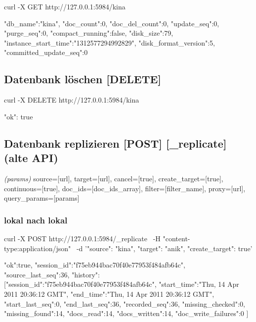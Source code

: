 \documentclass[19pt,landscape,twocolumn]{article}
\newcommand{\htmlverb}[1]{{[}\textbf{{#1}}{]}}
\newcommand{\brackets}[1]{{[}{#1}{]}}
\newcommand{\setparskip}{\setlength{\parskip}{-6mm}}
\newcommand{\resetparskip}{\setlength{\parskip}{1mm}}
\begin{document}
\begin{code}
curl -X GET http://127.0.0.1:5984/kina
\end{code}
\setparskip
\begin{response}
{"db_name":"kina",
 "doc_count":0,
 "doc_del_count":0,
 "update_seq":0,
 "purge_seq":0,
 "compact_running":false,
 "disk_size":79,
 "instance_start_time":"1312577294992829",
 "disk_format_version":5,
 "committed_update_seq":0}
\end{response}
\resetparskip

\subsection{Datenbank löschen \htmlverb{DELETE}}

\begin{code}
curl -X DELETE http://127.0.0.1:5984/kina
\end{code}
\setparskip
\begin{response}
{"ok": true}
\end{response}
\resetparskip

\subsection{Datenbank replizieren \htmlverb{POST} \htmlverb{\_replicate} (alte API)}
\emph{(params)} source=\brackets{url}, target=\brackets{url}, cancel=\brackets{true}, create\_target=\brackets{true},\newline
continuous=\brackets{true}, doc\_ids=\brackets{doc\_ids\_array}, filter=\brackets{filter\_name},\newline
proxy=\brackets{url}, query\_params=\brackets{params}

\subsubsection{lokal nach lokal}
\begin{code}
curl -X POST http://127.0.0.1:5984/_replicate \
     -H "content-type:application/json" \
     -d '{"source": "kina",
          "target": "anik",
          "create_target": true}'
\end{code}
\setparskip
\begin{response}
{"ok":true, "session_id":"f75eb944bac70f40e77953f484afb64c",
 "source_last_seq":36, "history":
   [{"session_id":"f75eb944bac70f40e77953f484afb64c",
     "start_time":"Thu, 14 Apr 2011 20:36:12 GMT",
     "end_time":"Thu, 14 Apr 2011 20:36:12 GMT",
     "start_last_seq":0,
     "end_last_seq":36,
     "recorded_seq":36,
     "missing_checked":0,
     "missing_found":14,
     "docs_read":14,
     "docs_written":14,
     "doc_write_failures":0
  }]
}
\end{response}
\resetparskip
\end{document}
